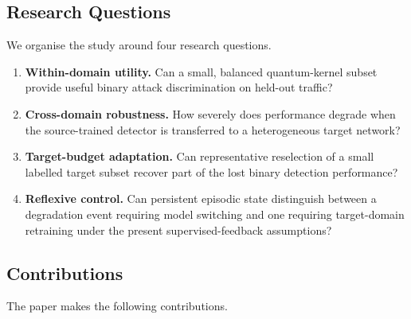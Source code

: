 \documentclass[conference]{IEEEtran}
\begin{document}
\subsection{Research Questions}

We organise the study around four research questions.

\begin{enumerate}
\item \textbf{Within-domain utility.} Can a small, balanced quantum-kernel
subset provide useful binary attack discrimination on held-out traffic?
\item \textbf{Cross-domain robustness.} How severely does performance
degrade when the source-trained detector is transferred to a
heterogeneous target network?
\item \textbf{Target-budget adaptation.} Can representative reselection of
a small labelled target subset recover part of the lost binary detection
performance?
\item \textbf{Reflexive control.} Can persistent episodic state
distinguish between a degradation event requiring model switching and one
requiring target-domain retraining under the present supervised-feedback
assumptions?
\end{enumerate}

\subsection{Contributions}

The paper makes the following contributions.
\end{document}
